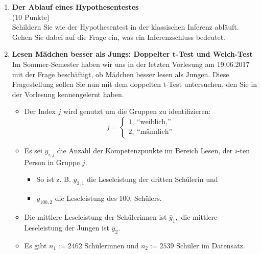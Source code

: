 \documentclass[11pt]{article}
\newcommand{\PRACTICAL}[1]{\marginpar{\tiny {\bf Aufgabe \\ abgeben!} #1}}
\newcommand{\startwert}{3}
\newcommand{\punkte}[1]{{\small{ }(#1 Punkte)}}
\newcommand{\aufgabe}[1]{\item{\bf #1}}
\begin{document}
\begin{enumerate}\addtocounter{enumi}{\startwert}


\aufgabe{Der Ablauf eines Hypothesentestes}\\ \punkte{10}  \PRACTICAL{}\\
Schildern Sie wie der Hypothesentest in der klassischen Inferenz abläuft. Gehen Sie dabei auf die Frage ein, was ein Inferenzschluss bedeutet. %

\aufgabe{Lesen Mädchen besser als Jungs: Doppelter t-Test und Welch-Test}\\
Im Sommer-Semester haben wir uns in der letzten Vorlesung am 19.06.2017 mit der Frage beschäftigt, ob Mädchen 
besser lesen als Jungen. Diese Fragestellung sollen Sie nun mit dem doppelten t-Test untersuchen, den Sie in der
Vorlesung kennengelernt haben.

\begin{itemize}
\item{Der  Index $j$ wird genutzt um die Gruppen zu identifizieren:
     \[
     j=\left\{\begin{array}{ll} 1, \: \text{``weiblich,''} \\
        2, \:  \text{``männlich''}\end{array}\right. 
  \]

}
\item{Es sei $y_{i,j}$ die Anzahl der Kompetenzpunkte im Bereich Lesen, der $i$-ten Person in Gruppe $j.$
\begin{itemize}
\item{So ist z. B. $y_{3,1}$ die Leseleistung der dritten Schülerin und}
\item{$y_{100,2}$ die Leseleistung des 100. Schülers.}
\end{itemize}
}
\item{Die mittlere Leseleistung der Schülerinnen ist $\bar{y}_{1},$
die mittlere Leseleistung der Jungen ist $\bar{y}_{2}.$ }
\item{Es gibt $n_{1}:=2462$ Schülerinnen und  $n_{2}:=2539$ Schüler im Datensatz.}
\end{itemize}


\end{enumerate}
\end{document}
